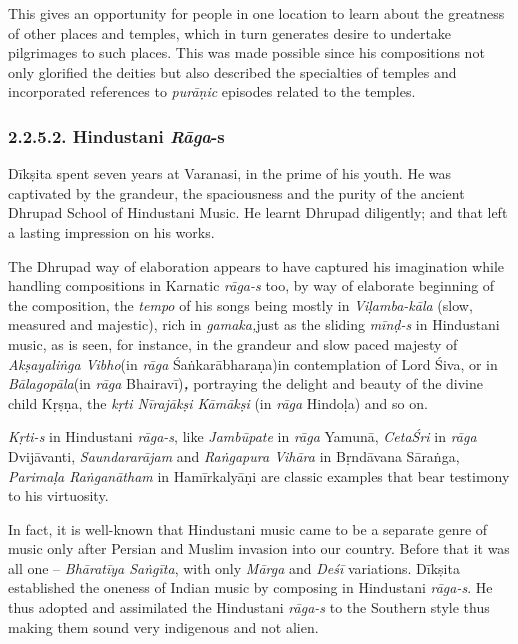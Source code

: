 This gives an opportunity for people in one location to learn about the greatness of other places and temples, which in turn generates desire to undertake pilgrimages to such places. This was made possible since his compositions not only glorified the deities but also described the specialties of temples and incorporated references to \textit{purāṇic} episodes related to the temples.

\vspace{-.3cm}

\subsubsection*{2.2.5.2. Hindustani \textit{Rāga}-s}

Dīkṣita spent seven years at Varanasi, in the prime of his youth. He was captivated by the grandeur, the spaciousness and the purity of the ancient Dhrupad School of Hindustani Music. He learnt Dhrupad diligently; and that left a lasting impression on his works.

The Dhrupad way of elaboration appears to have captured his imagination while handling compositions in Karnatic \textit{rāga-s} too, by way of elaborate beginning of the composition, the \textit{tempo} of his songs being mostly in \textit{Viḷamba-kāla} (slow, measured and majestic), rich in \textit{gamaka,}just as the sliding \textit{mīnḍ-s} in Hindustani music, as is seen, for instance, in the grandeur and slow paced majesty of \textit{Akṣayaliṅga Vibho}(in \textit{rāga} Śaṅkarābharaṇa)in contemplation of Lord Śiva, or in \textit{Bālagopāla}(in \textit{rāga} Bhairavī)\textit{\textbf{, }}portraying the delight and beauty of the divine child Kṛṣṇa, the \textit{kṛti Nīrajākṣi Kāmākṣi} (in \textit{rāga} Hindoḷa) and so on.

\textit{Kṛti-s} in Hindustani \textit{rāga-s}, like \textit{Jambūpate} in \textit{rāga} Yamunā, \textit{CetaŚri} in \textit{rāga} Dvijāvanti, \textit{Saundararājam} and \textit{Raṅgapura Vihāra} in Bṛndāvana Sāraṅga, \textit{Parimaḷa Raṅganātham} in Hamīrkalyāṇi are classic examples that bear testimony to his virtuosity.

In fact, it is well-known that Hindustani music came to be a separate genre of music only after Persian and Muslim invasion into our country. Before that it was all one – \textit{Bhāratīya Saṅgīta}, with only \textit{Mārga} and \textit{Deśī} variations. Dīkṣita established the oneness of Indian music by composing in Hindustani \textit{rāga-s}. He thus adopted and assimilated the Hindustani \textit{rāga-s} to the Southern style thus making them sound very indigenous and not alien.

